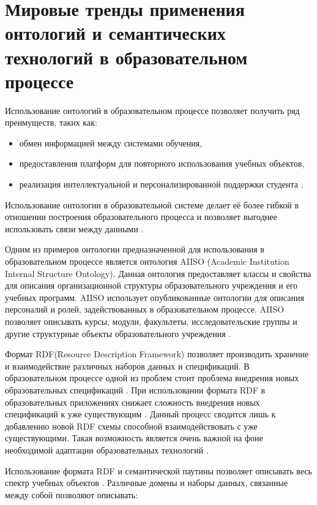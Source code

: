 \section{Мировые тренды применения онтологий и семантических технологий в образовательном процессе} \label{sect1_6}

Использование онтологий в образовательном процессе позволяет получить ряд преимуществ, таких как:
\begin{itemize}
\item обмен информацией между системами обучения, 
\item предоставления платформ для повторного использования учебных объектов,
\item реализация интеллектуальной и персонализированной поддержки студента \cite{gaeta2011ontology}.
\end{itemize}

Использование онтологии в образовательной системе делает её более гибкой в отношении построения образовательного процесса и позволяет выгоднее использовать связи между данными \cite{wilson2004role}.

Одним из примеров онтологии предназначенной для использования в образовательном процессе является онтология AIISO (Academic Institution Internal Structure Ontology). Данная онтология предоставляет классы и свойства для описания организационной структуры образовательного учреждения и его учебных программ. AIISO использует опубликованные онтологии для описания персоналий и ролей, задействованных в образовательном процессе. AIISO позволяет описывать курсы, модули, факультеты, исследовательские группы и другие структурные объекты образовательного учреждения \cite{styles2008academic}. 

Формат RDF(Resource Description Framework) позволяет производить хранение и взаимодействие различных наборов данных и спецификаций. В образовательном процессе одной из проблем стоит проблема внедрения новых образовательных спецификаций \cite{henze2004reasoning}. При использовании формата RDF в образовательных приложениях снижает сложность внедрения новых спецификаций к уже существующим \cite{moller2010learning}. Данный процесс сводится лишь к добавлению новой RDF схемы способной взаимодействовать с уже существующими. Такая возможность является очень важной на фоне необходимой адаптации образовательных технологий \cite{nilsson2001semantic}. 

Использование формата RDF и семантической паутины позволяет описывать весь спектр учебных объектов \cite{bouzeghoub2004rdf}. Различные домены и наборы данных, связанные между собой позволяют описывать:

